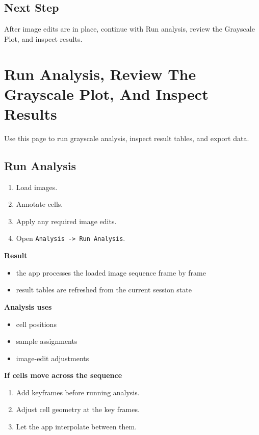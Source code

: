 \documentclass[
  9pt,
  letterpaper,
  oneside,
  open=any,
  DIV=15,
  parskip=half-,
  headings=big,
  numbers=noenddot
]{scrbook}
\newcommand{\manuallead}[1]{%
  \vspace{0.15em}%
  {\sffamily\bfseries\color{ManualBlue}#1}\par\nobreak\vspace{0.05em}%
}
\begin{document}
\section{Next Step}

After image edits are in place, continue with Run analysis, review the Grayscale Plot, and inspect results.


\chapter{Run Analysis, Review The Grayscale Plot, And Inspect Results}

Use this page to run grayscale analysis, inspect result tables, and export data.


\section{Run Analysis}

\begin{enumerate}[leftmargin=*,itemsep=0.35em,topsep=0.4em]
\item Load images.
\item Annotate cells.
\item Apply any required image edits.
\item Open \texttt{Analysis -> Run Analysis}.
\end{enumerate}

\manuallead{Result}

\begin{itemize}[leftmargin=*,itemsep=0.35em,topsep=0.4em]
\item the app processes the loaded image sequence frame by frame
\item result tables are refreshed from the current session state
\end{itemize}

\manuallead{Analysis uses}

\begin{itemize}[leftmargin=*,itemsep=0.35em,topsep=0.4em]
\item cell positions
\item sample assignments
\item image-edit adjustments
\end{itemize}

\manuallead{If cells move across the sequence}

\begin{enumerate}[leftmargin=*,itemsep=0.35em,topsep=0.4em]
\item Add keyframes before running analysis.
\item Adjust cell geometry at the key frames.
\item Let the app interpolate between them.
\end{enumerate}
\end{document}
